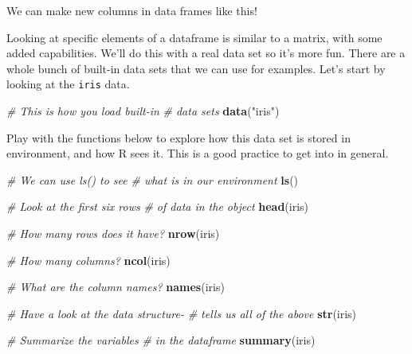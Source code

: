 \documentclass[
]{book}
\newenvironment{Shaded}{\begin{snugshade}}{\end{snugshade}}
\newcommand{\CommentTok}[1]{\textcolor[rgb]{0.56,0.35,0.01}{\textit{#1}}}
\newcommand{\KeywordTok}[1]{\textcolor[rgb]{0.13,0.29,0.53}{\textbf{#1}}}
\newcommand{\NormalTok}[1]{#1}
\newcommand{\OperatorTok}[1]{\textcolor[rgb]{0.81,0.36,0.00}{\textbf{#1}}}
\newcommand{\StringTok}[1]{\textcolor[rgb]{0.31,0.60,0.02}{#1}}
\begin{document}
We can make new columns in data frames like this!

\begin{Shaded}
\end{Shaded}

Looking at specific elements of a dataframe is similar to a matrix, with some added capabilities. We'll do this with a real data set so it's more fun. There are a whole bunch of built-in data sets that we can use for examples. Let's start by looking at the \texttt{iris} data.

\begin{Shaded}
\begin{Highlighting}[]
\CommentTok{# This is how you load built-in}
\CommentTok{# data sets}
\KeywordTok{data}\NormalTok{(}\StringTok{"iris"}\NormalTok{)}
\end{Highlighting}
\end{Shaded}

Play with the functions below to explore how this data set is stored in environment, and how R sees it. This is a good practice to get into in general.

\begin{Shaded}
\begin{Highlighting}[]
\CommentTok{# We can use ls() to see}
\CommentTok{# what is in our environment}
\KeywordTok{ls}\NormalTok{()}

\CommentTok{# Look at the first six rows}
\CommentTok{# of data in the object}
\KeywordTok{head}\NormalTok{(iris)}

\CommentTok{# How many rows does it have?}
\KeywordTok{nrow}\NormalTok{(iris)}

\CommentTok{# How many columns?}
\KeywordTok{ncol}\NormalTok{(iris)}

\CommentTok{# What are the column names?}
\KeywordTok{names}\NormalTok{(iris)}

\CommentTok{# Have a look at the data structure-}
\CommentTok{# tells us all of the above}
\KeywordTok{str}\NormalTok{(iris)}

\CommentTok{# Summarize the variables}
\CommentTok{# in the dataframe}
\KeywordTok{summary}\NormalTok{(iris)}
\end{Highlighting}
\end{Shaded}
\end{document}
